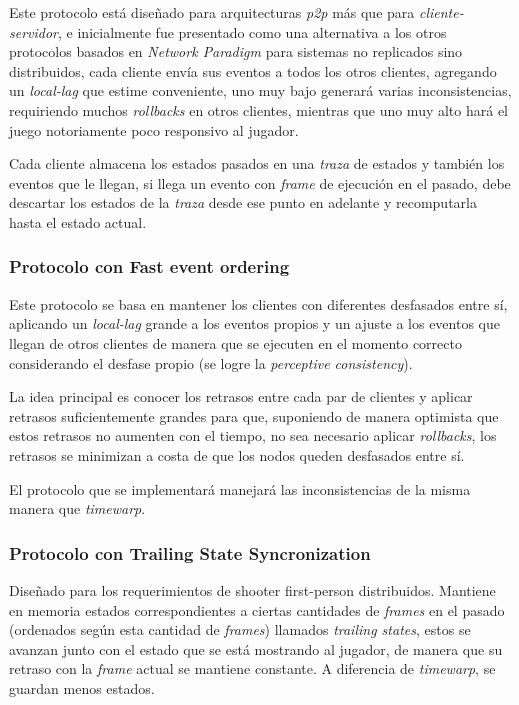 Este protocolo está diseñado para arquitecturas \emph{p2p} más que para \emph{cliente-servidor}, e inicialmente fue presentado como una alternativa a los otros protocolos basados en \emph{Network Paradigm} para sistemas no replicados sino distribuidos, cada cliente envía sus eventos a todos los otros clientes, agregando un \emph{local-lag} que estime conveniente, uno muy bajo generará varias inconsistencias, requiriendo muchos \emph{rollbacks} en otros clientes, mientras que uno muy alto hará el juego notoriamente poco responsivo al jugador.

Cada cliente almacena los estados pasados en una \emph{traza} de estados y también los eventos que le llegan, si llega un evento con \emph{frame} de ejecución en el pasado, debe descartar los estados de la \emph{traza} desde ese punto en adelante y recomputarla hasta el estado actual.

\subsubsection{Protocolo con Fast event ordering}

Este protocolo se basa en mantener los clientes con diferentes desfasados entre sí, aplicando un \emph{local-lag} grande a los eventos propios y un ajuste a los eventos que llegan de otros clientes de manera que se ejecuten en el momento correcto considerando el desfase propio (se logre la \emph{perceptive consistency}).

La idea principal es conocer los retrasos entre cada par de clientes y aplicar retrasos suficientemente grandes para que, suponiendo de manera optimista que estos retrasos no aumenten con el tiempo, no sea necesario aplicar \emph{rollbacks}, los retrasos se minimizan a costa de que los nodos queden desfasados entre sí.

El protocolo que se implementará manejará las inconsistencias de la misma manera que \emph{timewarp}.


\subsubsection{Protocolo con Trailing State Syncronization}

Diseñado para los requerimientos de shooter first-person distribuidos. Mantiene en memoria estados correspondientes a ciertas cantidades de \emph{frames} en el pasado (ordenados según esta cantidad de \emph{frames}) llamados \emph{trailing states}, estos se avanzan junto con el estado que se está mostrando al jugador, de manera que su retraso con la \emph{frame} actual se mantiene constante. A diferencia de \emph{timewarp}, se guardan menos estados.

